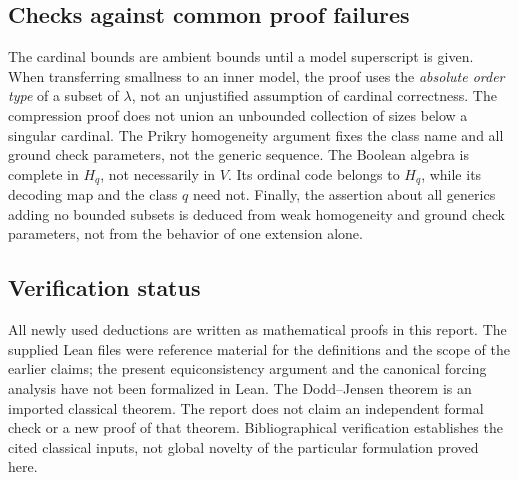 \documentclass[11pt,letterpaper]{article}
\theoremstyle{definition}
\numberwithin{equation}{section}
\begin{document}
\subsection{Checks against common proof failures}

The cardinal bounds are ambient bounds until a model superscript is given.
When transferring smallness to an inner model, the proof uses the
\emph{absolute order type} of a subset of $\lambda$, not an unjustified
assumption of cardinal correctness. The compression proof does not union
an unbounded collection of sizes below a singular cardinal. The Prikry
homogeneity argument fixes the class name and all ground check parameters,
not the generic sequence. The Boolean algebra is complete in $H_q$, not
necessarily in $V$. Its ordinal code belongs to $H_q$, while its decoding
map and the class $q$ need not. Finally, the assertion about all generics
adding no bounded subsets is deduced from weak homogeneity and ground
check parameters, not from the behavior of one extension alone.

\subsection{Verification status}

All newly used deductions are written as mathematical proofs in this
report. The supplied Lean files were reference material for the definitions
and the scope of the earlier claims; the present equiconsistency argument
and the canonical forcing analysis have not been formalized in Lean.
The Dodd--Jensen theorem is an imported classical theorem. The report does
not claim an independent formal check or a new proof of that theorem.
Bibliographical verification establishes the cited classical inputs, not
global novelty of the particular formulation proved here.
\end{document}
